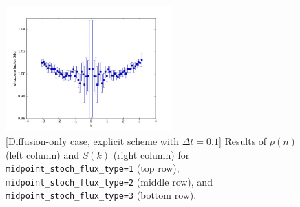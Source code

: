 \documentclass{article}
\begin{document}
\begin{figure}
\includegraphics[width=0.5\linewidth,height=1.9in]{fig1/appendix_exp_diff_dt0.1_Sk_mid3.jpg}
\caption{\label{fig_appendix_exp_diff_dt0.1_mid_type}[Diffusion-only case, explicit scheme with $\Delta t=0.1$] Results of $\rho(n)$ (left column) and $S(k)$ (right column) for \texttt{midpoint\_stoch\_flux\_type=1} (top row), \texttt{midpoint\_stoch\_flux\_type=2} (middle row), and \texttt{midpoint\_stoch\_flux\_type=3} (bottom row).
}
\end{figure}
\end{document}
